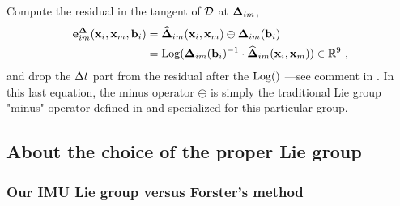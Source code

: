 Compute the residual in the  tangent of $\mathcal{D}$ at ${{\bm \Delta}}_{im}$,
%
\begin{align}
    {\bf e}^{{\bm \Delta}}_{im}({\bf x}_i,{\bf x}_m,{\bf b}_i) 
    &=\widehat{{{\bm \Delta}}}_{im}({\bf x}_i,{\bf x}_m) \ominus {{\bm \Delta}}_{im}({\bf b}_i) \\
    &=\operatorname*{Log}({{\bm \Delta}}_{im}({\bf b}_i)^{-1} \cdot \widehat{{{\bm \Delta}}}_{im}({\bf x}_i,{\bf x}_m)) \in {\mathbb R}^9
~,
\end{align}
%
and drop the $\Delta t$ part from the residual after the $\operatorname*{Log}()$ ---see comment in .
In this last equation, the minus operator $\ominus$ is simply the traditional Lie group "minus" operator defined in \cite{sola2018micro} and specialized for this particular group.


\subsection{About the choice of the proper Lie group}

\subsubsection{Our IMU Lie group versus Forster's method}

